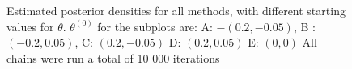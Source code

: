 \begin{figure}[ht]
    \caption{Estimated posterior densities for all methods, with different starting values for $\theta$. $\theta^{\left(0\right)}$ for the subplots are:   A: $-(0.2, -0.05)$, B : $(-0.2, 0.05)$, C: $(0.2, -0.05)$ D: $(0.2, 0.05)$ E: $(0,0)$ All chains were run a total of 10 000 iterations    }%
    \label{fig:density_50k_04_06_normal}%
\end{figure}




